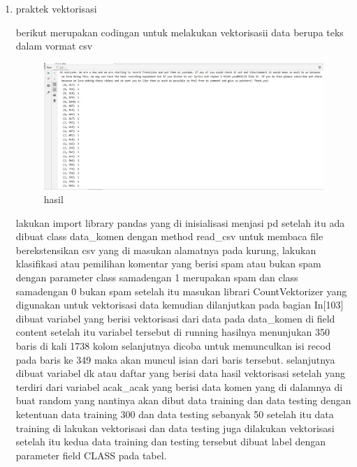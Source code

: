 \begin{enumerate}
\item praktek vektorisasi\par
berikut merupakan codingan untuk melakukan vektorisasii data berupa teks dalam vormat csv

\begin{figure}[ht]
\centering
\includegraphics[scale=0.5]{figures/1174042/chapter4/2,3.JPG}
\caption{hasil}
\label{Praktek no 3}
\end{figure}
lakukan import library pandas yang di inisialisasi menjasi pd setelah itu ada dibuat class data\_komen dengan method read\_csv untuk membaca file berekstensikan csv yang di masukan alamatnya pada kurung, lakukan klasifikasi atau pemilihan komentar yang berisi spam atau bukan spam dengan parameter class samadengan 1 merupakan spam dan class samadengan 0 bukan spam setelah itu masukan librari CountVektorizer yang digunakan untuk vektorisasi data kemudian dilanjutkan pada bagian In[103] dibuat variabel yang berisi vektorisasi dari data pada data\_komen di field content setelah itu variabel tersebut di running hasilnya menunjukan 350 baris di kali 1738 kolom selanjutnya dicoba untuk memunculkan isi recod pada baris ke 349 maka akan muncul isian dari baris tersebut. selanjutnya dibuat variabel dk atau daftar yang berisi data hasil vektorisasi setelah yang terdiri dari variabel acak\_acak yang berisi data komen yang di dalamnya di buat random yang nantinya akan dibut data training dan data testing dengan ketentuan data training 300 dan data testing sebanyak 50 setelah itu data training di lakukan vektorisasi dan data testing juga dilakukan vektorisasi setelah itu kedua data training dan testing tersebut dibuat label dengan parameter field CLASS pada tabel.


\end{enumerate}
